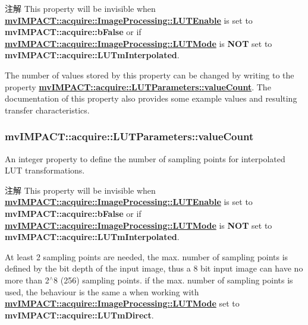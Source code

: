 \begin{DoxyNote}{注解}
This property will be invisible when {\bfseries \hyperlink{classmv_i_m_p_a_c_t_1_1acquire_1_1_image_processing_a7f8eb83578d97fde3405e6ae5d09e5c3}{mv\+I\+M\+P\+A\+C\+T\+::acquire\+::\+Image\+Processing\+::\+L\+U\+T\+Enable}} is set to {\bfseries mv\+I\+M\+P\+A\+C\+T\+::acquire\+::b\+False} or if {\bfseries \hyperlink{classmv_i_m_p_a_c_t_1_1acquire_1_1_image_processing_ae2f3059a3574e6a08a2d4348f1d5a152}{mv\+I\+M\+P\+A\+C\+T\+::acquire\+::\+Image\+Processing\+::\+L\+U\+T\+Mode}} is {\bfseries N\+O\+T} set to {\bfseries mv\+I\+M\+P\+A\+C\+T\+::acquire\+::\+L\+U\+Tm\+Interpolated}.
\end{DoxyNote}
The number of values stored by this property can be changed by writing to the property {\bfseries \hyperlink{classmv_i_m_p_a_c_t_1_1acquire_1_1_l_u_t_parameters_a490895560ff62d99203f9b9cb008c26d}{mv\+I\+M\+P\+A\+C\+T\+::acquire\+::\+L\+U\+T\+Parameters\+::value\+Count}}. The documentation of this property also provides some example values and resulting transfer characteristics. \hypertarget{classmv_i_m_p_a_c_t_1_1acquire_1_1_l_u_t_parameters_a490895560ff62d99203f9b9cb008c26d}{
\subsubsection[{value\+Count}]{ mv\+I\+M\+P\+A\+C\+T\+::acquire\+::\+L\+U\+T\+Parameters\+::value\+Count}}\label{classmv_i_m_p_a_c_t_1_1acquire_1_1_l_u_t_parameters_a490895560ff62d99203f9b9cb008c26d}


An integer property to define the number of sampling points for interpolated L\+U\+T transformations. 

\begin{DoxyNote}{注解}
This property will be invisible when {\bfseries \hyperlink{classmv_i_m_p_a_c_t_1_1acquire_1_1_image_processing_a7f8eb83578d97fde3405e6ae5d09e5c3}{mv\+I\+M\+P\+A\+C\+T\+::acquire\+::\+Image\+Processing\+::\+L\+U\+T\+Enable}} is set to {\bfseries mv\+I\+M\+P\+A\+C\+T\+::acquire\+::b\+False} or if {\bfseries \hyperlink{classmv_i_m_p_a_c_t_1_1acquire_1_1_image_processing_ae2f3059a3574e6a08a2d4348f1d5a152}{mv\+I\+M\+P\+A\+C\+T\+::acquire\+::\+Image\+Processing\+::\+L\+U\+T\+Mode}} is {\bfseries N\+O\+T} set to {\bfseries mv\+I\+M\+P\+A\+C\+T\+::acquire\+::\+L\+U\+Tm\+Interpolated}.
\end{DoxyNote}
At least 2 sampling points are needed, the max. number of sampling points is defined by the bit depth of the input image, thus a 8 bit input image can have no more than 2$^\wedge$8 (256) sampling points. if the max. number of sampling points is used, the behaviour is the same a when working with {\bfseries \hyperlink{classmv_i_m_p_a_c_t_1_1acquire_1_1_image_processing_ae2f3059a3574e6a08a2d4348f1d5a152}{mv\+I\+M\+P\+A\+C\+T\+::acquire\+::\+Image\+Processing\+::\+L\+U\+T\+Mode}} set to {\bfseries mv\+I\+M\+P\+A\+C\+T\+::acquire\+::\+L\+U\+Tm\+Direct}.

